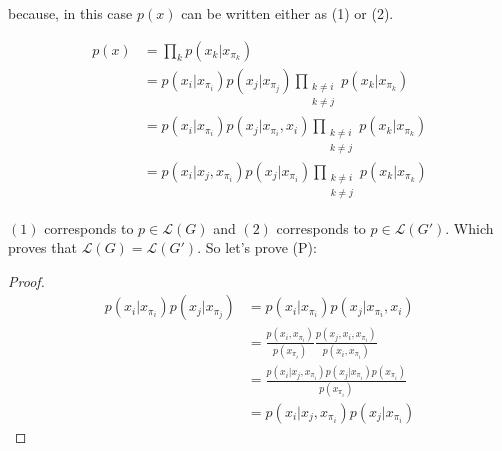 \documentclass[11pt]{article}
\numberwithin{figure}{section} %
\begin{document}
because, in this case $p(x)$ can be written either as (1) or (2).

\begin{align*}
p(x) &= \prod\limits_{k}p(x_k | x_{\pi_k}) \\
&= p(x_i | x_{\pi_i})p(x_j | x_{\pi_j}) \prod\limits_{\substack{k \neq i \\ k\neq j}}p(x_k | x_{\pi_k}) \\
& = p(x_i | x_{\pi_i})p(x_j|x_{\pi_i},x_i)\prod\limits_{\substack{k \neq i \\ k\neq j}}p(x_k | x_{\pi_k})\tag{1} \\
&= p(x_i|x_j, x_{\pi_i})p(x_j|x_{\pi_i}) \prod\limits_{\substack{k \neq i \\ k\neq j}}p(x_k | x_{\pi_k})\tag{2}
\end{align*}

$(1)$ corresponds to $p \in \mathcal{L}(G)$ and $(2)$ corresponds to $p \in \mathcal{L}(G')$. Which proves that $\mathcal{L}(G)=\mathcal{L}(G')$.
So let's prove (P):

\begin{proof}
\begin{align*}
p(x_i | x_{\pi_i})p(x_j | x_{\pi_j}) &= p(x_i | x_{\pi_i})p(x_j|x_{\pi_i},x_i) \\
&= \frac{p(x_i, x_{\pi_i})}{p(x_{\pi_i})} \frac{p(x_j, x_i, x_{\pi_i})}{p(x_i,x_{\pi_i})} \\
&= \frac{p(x_i|x_j, x_{\pi_i})p(x_j|x_{\pi_i})p(x_{\pi_i})}{p(x_{\pi_i})} \\
&= p(x_i|x_j, x_{\pi_i})p(x_j|x_{\pi_i})
\end{align*}
\end{proof}
\end{document}
